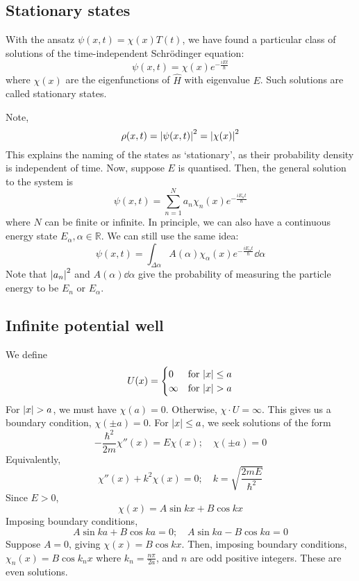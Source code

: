 \subsection{Stationary states}
\begin{definition}
	With the ansatz \( \psi(x,t) = \chi(x) T(t) \), we have found a particular class of solutions of the time-independent Schr\"odinger equation:
	\[
		\psi(x,t) = \chi(x) e^{-\frac{i E t}{\hbar}}
	\]
	where \( \chi(x) \) are the eigenfunctions of \( \hat H \) with eigenvalue \( E \).
	Such solutions are called stationary states.
\end{definition}
\noindent Note,
\[
	\rho(x,t) = \abs{\psi(x,t)}^2 = \abs{\chi(x)}^2
\]
This explains the naming of the states as `stationary', as their probability density is independent of time.
Now, suppose \( E \) is quantised.
Then, the general solution to the system is
\[
	\psi(x,t) = \sum_{n=1}^N a_n \chi_n(x) e^{-\frac{iE_n t}{\hbar}}
\]
where \( N \) can be finite or infinite.
In principle, we can also have a continuous energy state \( E_\alpha, \alpha \in \mathbb R \).
We can still use the same idea:
\[
	\psi(x,t) = \int_{\Delta \alpha} A(\alpha) \chi_\alpha(x) e^{-\frac{iE_\alpha t}{\hbar}} \dd{\alpha}
\]
Note that \( \abs{a_n}^2 \) and \( A(\alpha) \dd{\alpha} \) give the probability of measuring the particle energy to be \( E_n \) or \( E_\alpha \).

\subsection{Infinite potential well}
We define
\[
	U(x) = \begin{cases}
		0      & \text{for } \abs{x} \leq a \\
		\infty & \text{for } \abs{x} > a
	\end{cases}
\]
For \( \abs{x} > a \), we must have \( \chi(a) = 0 \).
Otherwise, \( \chi \cdot U = \infty \).
This gives us a boundary condition, \( \chi(\pm a) = 0 \).
For \( \abs{x} \leq a \), we seek solutions of the form
\[
	-\frac{\hbar^2}{2m} \chi''(x) = E \chi(x);\quad \chi(\pm a) = 0
\]
Equivalently,
\[
	\chi''(x) + k^2 \chi(x) = 0;\quad k = \sqrt{\frac{2mE}{\hbar^2}}
\]
Since \( E > 0 \),
\[
	\chi(x) = A \sin kx + B \cos kx
\]
Imposing boundary conditions,
\[
	A \sin ka + B \cos ka = 0;\quad A \sin ka - B \cos ka = 0
\]
Suppose \( A = 0 \), giving \( \chi(x) = B \cos kx \).
Then, imposing boundary conditions, \( \chi_n(x) = B \cos k_n x \) where \( k_n = \frac{n \pi}{2a} \), and \( n \) are odd positive integers.
These are even solutions.

